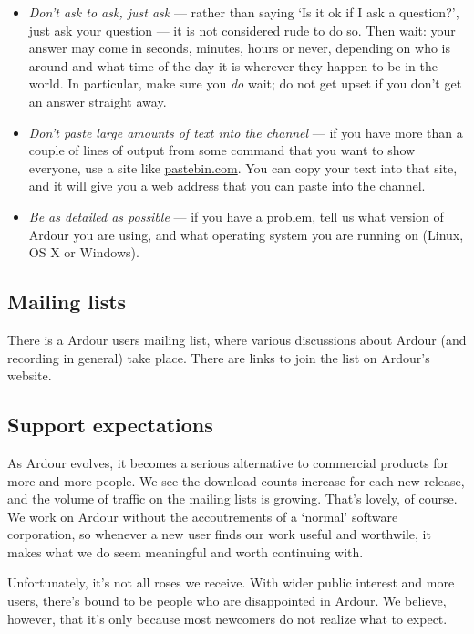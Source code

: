 \documentclass[10pt,a4paper]{book}
\begin{document}
\begin{itemize}
\item \emph{Don't ask to ask, just ask} --- rather than saying `Is it
  ok if I ask a question?', just ask your question --- it is not
  considered rude to do so.  Then wait: your answer may come in
  seconds, minutes, hours or never, depending on who is around and
  what time of the day it is wherever they happen to be in the world.
  In particular, make sure you \emph{do} wait; do not get upset if you
  don't get an answer straight away.
\item \emph{Don't paste large amounts of text into the channel} --- if
  you have more than a couple of lines of output from some command
  that you want to show everyone, use a site like \url{pastebin.com}.
  You can copy your text into that site, and it will give you a web
  address that you can paste into the channel.
\item \emph{Be as detailed as possible} --- if you have a problem,
  tell us what version of Ardour you are using, and what operating
  system you are running on (Linux, OS X or Windows).
\end{itemize}


\subsection{Mailing lists}

There is a Ardour users mailing list, where various discussions about
Ardour (and recording in general) take place.  There are links to join
the list on Ardour's website.


\subsection{Support expectations}

As Ardour evolves, it becomes a serious alternative to commercial
products for more and more people. We see the download counts increase
for each new release, and the volume of traffic on the mailing lists
is growing. That's lovely, of course. We work on Ardour without the
accoutrements of a `normal' software corporation, so whenever a new
user finds our work useful and worthwile, it makes what we do seem
meaningful and worth continuing with.

Unfortunately, it's not all roses we receive.  With wider public
interest and more users, there's bound to be people who are
disappointed in Ardour. We believe, however, that it's only because
most newcomers do not realize what to expect.
\end{document}

